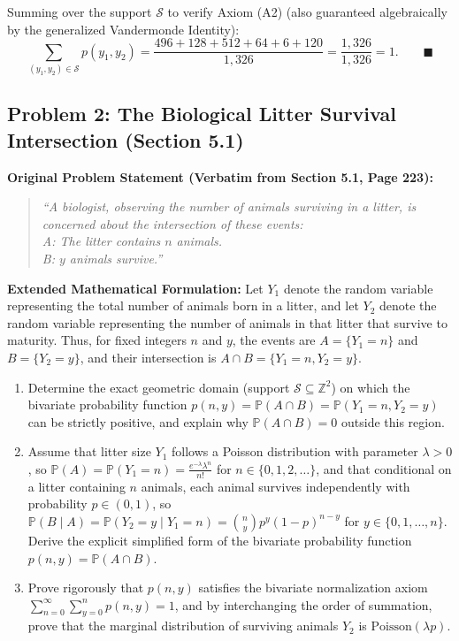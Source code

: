\documentclass[11pt, letterpaper]{article}
\theoremstyle{definition}
\theoremstyle{remark}
\newcommand{\Z}{\mathbb{Z}}
\newcommand{\Prob}{\mathbb{P}}
\begin{document}
Summing over the support $\mathcal{S}$ to verify Axiom (A2) (also guaranteed algebraically by the generalized Vandermonde Identity):
\[
\sum_{(y_1, y_2) \in \mathcal{S}} p(y_1, y_2) = \frac{496 + 128 + 512 + 64 + 6 + 120}{1{,}326} = \frac{1{,}326}{1{,}326} = 1. \qquad \blacksquare
\]

\subsection{Problem 2: The Biological Litter Survival Intersection (Section 5.1)}

\textbf{Original Problem Statement (Verbatim from Section 5.1, Page 223):}
\begin{quote}
\emph{``A biologist, observing the number of animals surviving in a litter, is concerned about the intersection of these events:\\
A: The litter contains $n$ animals.\\
B: $y$ animals survive.''}
\end{quote}

\textbf{Extended Mathematical Formulation:}
Let $Y_1$ denote the random variable representing the total number of animals born in a litter, and let $Y_2$ denote the random variable representing the number of animals in that litter that survive to maturity. Thus, for fixed integers $n$ and $y$, the events are $A = \{Y_1 = n\}$ and $B = \{Y_2 = y\}$, and their intersection is $A \cap B = \{Y_1 = n, Y_2 = y\}$.
\begin{enumerate}[label=(\alph*)]
    \item Determine the exact geometric domain (support $\mathcal{S} \subseteq \Z^2$) on which the bivariate probability function $p(n, y) = \Prob(A \cap B) = \Prob(Y_1 = n, Y_2 = y)$ can be strictly positive, and explain why $\Prob(A \cap B) = 0$ outside this region.
    \item Assume that litter size $Y_1$ follows a Poisson distribution with parameter $\lambda > 0$, so $\Prob(A) = \Prob(Y_1 = n) = \frac{e^{-\lambda}\lambda^n}{n!}$ for $n \in \{0, 1, 2, \dots\}$, and that conditional on a litter containing $n$ animals, each animal survives independently with probability $p \in (0, 1)$, so $\Prob(B \mid A) = \Prob(Y_2 = y \mid Y_1 = n) = \binom{n}{y}p^y(1-p)^{n-y}$ for $y \in \{0, 1, \dots, n\}$. Derive the explicit simplified form of the bivariate probability function $p(n, y) = \Prob(A \cap B)$.
    \item Prove rigorously that $p(n, y)$ satisfies the bivariate normalization axiom $\sum_{n=0}^{\infty} \sum_{y=0}^{n} p(n, y) = 1$, and by interchanging the order of summation, prove that the marginal distribution of surviving animals $Y_2$ is $\text{Poisson}(\lambda p)$.
\end{enumerate}
\end{document}
